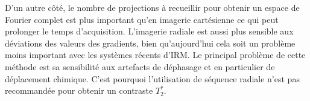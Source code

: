 D'un autre côté, le nombre de projections à recueillir pour obtenir un espace de Fourier complet est plus important qu'en imagerie cartésienne ce qui peut prolonger le temps d'acquisition. L'imagerie radiale est aussi plus sensible aux déviations des valeurs des gradients, bien qu'aujourd'hui cela soit un problème moins important avec les systèmes récents d'IRM. Le principal problème de cette méthode est sa sensibilité aux artefacts de déphasage et en particulier de déplacement chimique. C'est pourquoi l'utilisation de séquence radiale n'est pas recommandée pour obtenir un contraste $T_2^*$.


